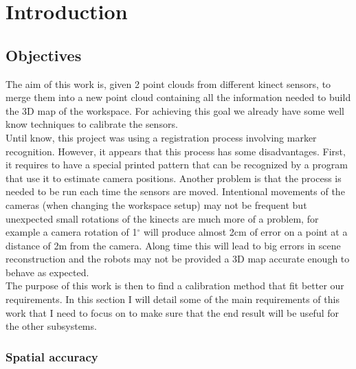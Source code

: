
\chapter{Introduction}

\section{Objectives}

The aim of this work is, given 2 point clouds from different kinect sensors, to merge them into a new point cloud containing all the information needed to build the 3D map of the workspace. For achieving this goal we already have some well know techniques to calibrate the sensors. \\
Until know, this project was using a registration process involving marker recognition. However, it appears that this process has some disadvantages. First, it requires to have a special printed pattern that can be recognized by a program that use it to estimate camera positions. Another problem is that the process is needed to be run each time the sensors are moved. Intentional movements of the cameras (when changing the workspace setup) may not be frequent but unexpected small rotations of the kinects are much more of a problem, for example a camera rotation of 1$^\circ$ will produce almost 2cm of error on a point at a distance of 2m from the camera. Along time this will lead to big errors in scene reconstruction and the robots may not be provided a 3D map accurate enough to behave as expected. \\
The purpose of this work is then to find a calibration method that fit better our requirements. In this section I will detail some of the main requirements of this work that I need to focus on to make sure that the end result will be useful for the other subsystems.

\subsection{Spatial accuracy}

